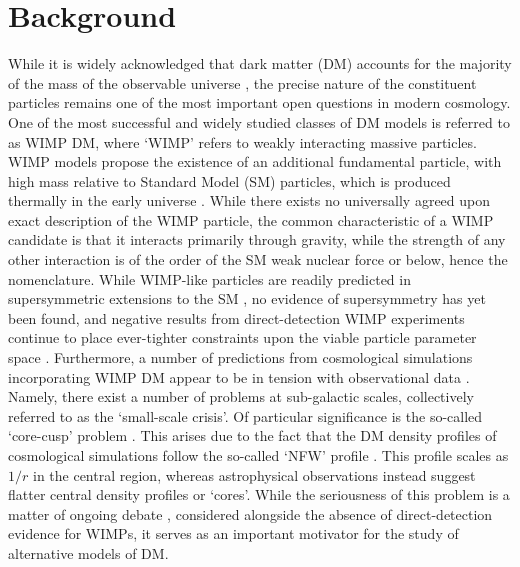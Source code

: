 \section{Background}

While it is widely acknowledged that dark matter (DM) accounts for the majority of the mass of the observable universe \cite{Ade:2015xua}, the precise nature of the constituent particles remains one of the most important open questions in modern cosmology. One of the most successful and widely studied classes of DM models is referred to as WIMP DM, where `WIMP' refers to weakly interacting massive particles. WIMP models propose the existence of an additional fundamental particle, with high mass relative to Standard Model (SM) particles, which is produced thermally in the early universe \cite{Roszkowski:2017nbc}. While there exists no universally agreed upon exact description of the WIMP particle, the common characteristic of a WIMP candidate is that it interacts primarily through gravity, while the strength of any other interaction is of the order of the SM weak nuclear force or below, hence the nomenclature. While WIMP-like particles are readily predicted in supersymmetric extensions to the SM \cite{Chang:2013oia}, no evidence of supersymmetry has yet been found, and negative results from direct-detection WIMP experiments continue to place ever-tighter constraints upon the viable particle parameter space \cite{Cui:2017nnn}. Furthermore, a number of predictions from cosmological simulations incorporating WIMP DM appear to be in tension with observational data \cite{Bullock:2017xww}. Namely, there exist a number of problems at sub-galactic scales, collectively referred to as the `small-scale crisis'. Of particular significance is the so-called `core-cusp' problem \cite{Moore:1994yx}. This arises due to the fact that the DM density profiles of cosmological simulations follow the so-called `NFW' profile \cite{Navarro:1995iw}. This profile scales as $1/r$ in the central region, whereas astrophysical observations instead suggest flatter central density profiles or `cores'. While the seriousness of this problem is a matter of ongoing debate \cite{anna2018}, considered alongside the absence of direct-detection evidence for WIMPs, it serves as an important motivator for the study of alternative models of DM. 


